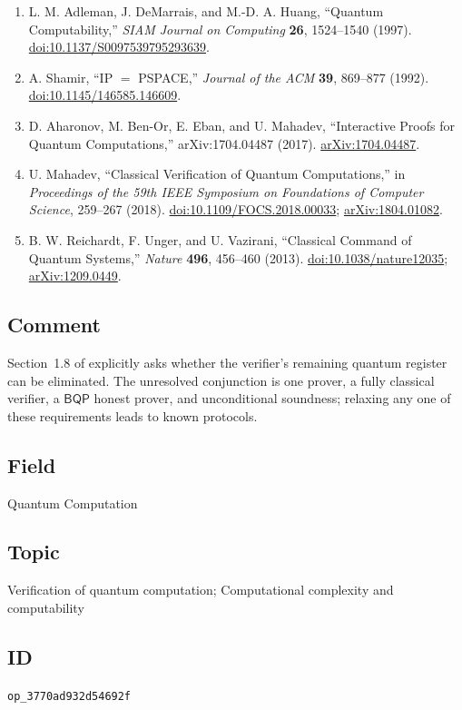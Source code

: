 \begin{enumerate}[label={},leftmargin=4.8em,labelsep=0.5em]
  \footnotesize
  \item[\textup{[ADH97]}]\label{ref:p39-adleman}
  L. M. Adleman, J. DeMarrais, and M.-D. A. Huang,
  ``Quantum Computability,'' \emph{SIAM Journal on Computing} \textbf{26},
  1524--1540 (1997).
  \href{https://doi.org/10.1137/S0097539795293639}{doi:10.1137/S0097539795293639}.

  \item[\textup{[Sha92]}]\label{ref:p39-shamir}
  A. Shamir, ``IP $=$ PSPACE,'' \emph{Journal of the ACM} \textbf{39},
  869--877 (1992).
  \href{https://doi.org/10.1145/146585.146609}{doi:10.1145/146585.146609}.

  \item[\textup{[ABE+17]}]\label{ref:p39-aharonov}
  D. Aharonov, M. Ben-Or, E. Eban, and U. Mahadev,
  ``Interactive Proofs for Quantum Computations,'' arXiv:1704.04487 (2017).
  \href{https://arxiv.org/abs/1704.04487}{arXiv:1704.04487}.

  \item[\textup{[Mah18]}]\label{ref:p39-mahadev}
  U. Mahadev, ``Classical Verification of Quantum Computations,'' in
  \emph{Proceedings of the 59th IEEE Symposium on Foundations of Computer
  Science}, 259--267 (2018).
  \href{https://doi.org/10.1109/FOCS.2018.00033}{doi:10.1109/FOCS.2018.00033};
  \href{https://arxiv.org/abs/1804.01082}{arXiv:1804.01082}.

  \item[\textup{[RUV13]}]\label{ref:p39-reichardt}
  B. W. Reichardt, F. Unger, and U. Vazirani,
  ``Classical Command of Quantum Systems,'' \emph{Nature} \textbf{496},
  456--460 (2013).
  \href{https://doi.org/10.1038/nature12035}{doi:10.1038/nature12035};
  \href{https://arxiv.org/abs/1209.0449}{arXiv:1209.0449}.
\end{enumerate}

\subsection*{Comment}

Section~1.8 of  explicitly asks whether
the verifier's remaining quantum register can be eliminated.  The unresolved
conjunction is one prover, a fully classical verifier, a $\mathsf{BQP}$ honest
prover, and unconditional soundness; relaxing any one of these requirements
leads to known protocols.

\subsection*{Field}

Quantum Computation

\subsection*{Topic}

Verification of quantum computation; Computational complexity and computability

\subsection*{ID}

\texttt{op\_3770ad932d54692f}
